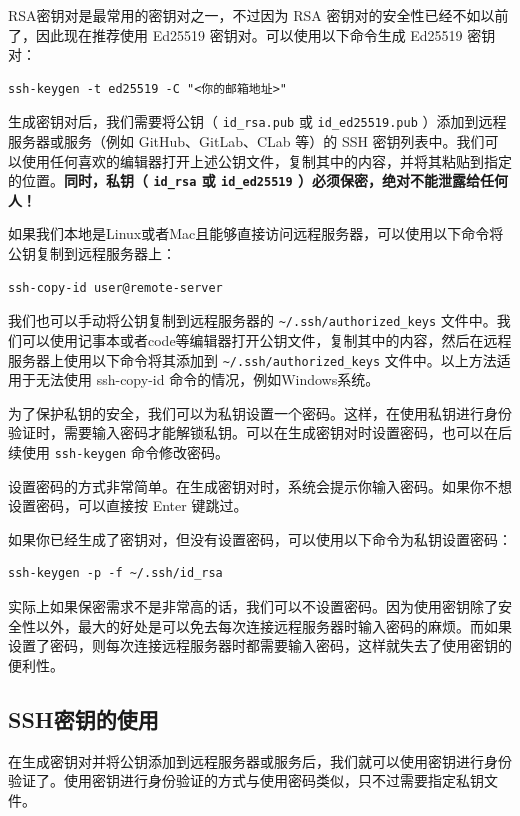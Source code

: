 RSA密钥对是最常用的密钥对之一，不过因为 RSA 密钥对的安全性已经不如以前了，因此现在推荐使用 Ed25519 密钥对。可以使用以下命令生成 Ed25519 密钥对：
\begin{verbatim}
ssh-keygen -t ed25519 -C "<你的邮箱地址>"
\end{verbatim}

生成密钥对后，我们需要将公钥（ \texttt{id\_rsa.pub}  或  \texttt{id\_ed25519.pub} ）添加到远程服务器或服务（例如 GitHub、GitLab、CLab 等）的 SSH 密钥列表中。我们可以使用任何喜欢的编辑器打开上述公钥文件，复制其中的内容，并将其粘贴到指定的位置。\textbf{\color{red}同时，私钥（ \texttt{id\_rsa}  或  \texttt{id\_ed25519} ）必须保密，绝对不能泄露给任何人！}

如果我们本地是Linux或者Mac且能够直接访问远程服务器，可以使用以下命令将公钥复制到远程服务器上：
\begin{verbatim}
ssh-copy-id user@remote-server
\end{verbatim}

我们也可以手动将公钥复制到远程服务器的  \texttt{\textasciitilde/.ssh/authorized\_keys}  文件中。我们可以使用记事本或者code等编辑器打开公钥文件，复制其中的内容，然后在远程服务器上使用以下命令将其添加到  \texttt{\textasciitilde/.ssh/authorized\_keys}  文件中。以上方法适用于无法使用 ssh-copy-id 命令的情况，例如Windows系统。

为了保护私钥的安全，我们可以为私钥设置一个密码。这样，在使用私钥进行身份验证时，需要输入密码才能解锁私钥。可以在生成密钥对时设置密码，也可以在后续使用  \texttt{ssh-keygen}  命令修改密码。

设置密码的方式非常简单。在生成密钥对时，系统会提示你输入密码。如果你不想设置密码，可以直接按 Enter 键跳过。

如果你已经生成了密钥对，但没有设置密码，可以使用以下命令为私钥设置密码：
\begin{verbatim}
ssh-keygen -p -f ~/.ssh/id_rsa
\end{verbatim}

实际上如果保密需求不是非常高的话，我们可以不设置密码。因为使用密钥除了安全性以外，最大的好处是可以免去每次连接远程服务器时输入密码的麻烦。而如果设置了密码，则每次连接远程服务器时都需要输入密码，这样就失去了使用密钥的便利性。

\subsection{SSH密钥的使用}

在生成密钥对并将公钥添加到远程服务器或服务后，我们就可以使用密钥进行身份验证了。使用密钥进行身份验证的方式与使用密码类似，只不过需要指定私钥文件。


